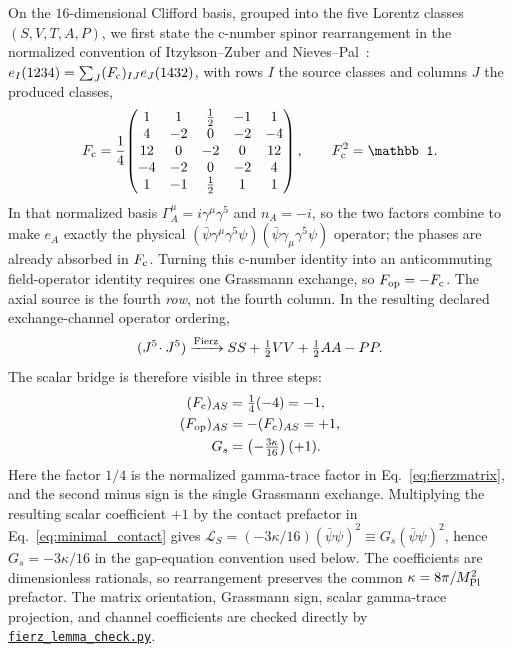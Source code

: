 \documentclass[aps,prd,twocolumn,superscriptaddress,preprintnumbers,nofootinbib,longbibliography,floatfix]{revtex4-2}
\newcommand{\artifactnamed}[2]{\href{https://github.com/Hubify-Projects/bigbounce/blob/7befce143848b925998a3e6ecc850aa510ab3a94/#1}{\nolinkurl{#2}}}
\begin{document}
On the $16$-dimensional Clifford basis, grouped into the five Lorentz classes
$(S,V,T,A,P)$, we first state the c-number spinor rearrangement in the
normalized convention of Itzykson--Zuber and Nieves--Pal~\cite{ItzyksonZuber,NievesPal2004}:
$e_I(1234)=\sum_J(F_{\rm c})_{IJ}e_J(1432)$, with rows $I$ the source classes
and columns $J$ the produced classes,
\begin{equation}\label{eq:fierzmatrix}
F_{\rm c}=\frac14\!\begin{pmatrix}
1&1&\tfrac12&-1&1\\
4&-2&0&-2&-4\\
12&0&-2&0&12\\
-4&-2&0&-2&4\\
1&-1&\tfrac12&1&1
\end{pmatrix},\qquad F_{\rm c}^{2}=\mathbb 1.
\end{equation}
In that normalized basis $\Gamma_A^\mu=i\gamma^\mu\gamma^5$ and
$n_A=-i$, so the two factors combine to make $e_A$ exactly the physical
$(\bar\psi\gamma^\mu\gamma^5\psi)
(\bar\psi\gamma_\mu\gamma^5\psi)$ operator; the phases are already absorbed
in $F_{\rm c}$.  Turning this c-number identity into an anticommuting
field-operator identity requires one Grassmann exchange, so
$F_{\rm op}=-F_{\rm c}$.
The axial source is the fourth
\emph{row}, not the fourth column.  In the resulting declared exchange-channel
operator ordering,
\begin{equation}\label{eq:AAdecomp}
(J^5\!\cdot J^5)\xrightarrow{\rm Fierz}
SS+\tfrac12 VV+\tfrac12 AA-PP.
\end{equation}
The scalar bridge is therefore visible in three steps:
\begin{equation}\label{eq:fierz_scalar_bridge}
\begin{aligned}
(F_{\rm c})_{AS}&=\tfrac14(-4)=-1,\\
(F_{\rm op})_{AS}&=- (F_{\rm c})_{AS}=+1,\\
G_s&=\left(-\tfrac{3\kappa}{16}\right)(+1).
\end{aligned}
\end{equation}
Here the factor $1/4$ is the normalized gamma-trace factor in
Eq.~\eqref{eq:fierzmatrix}, and the second minus sign is the single Grassmann
exchange.  Multiplying the resulting scalar coefficient $+1$ by
the contact prefactor in Eq.~\eqref{eq:minimal_contact} gives
$\mathcal L_{S}=(-3\kappa/16)(\bar\psi\psi)^2
\equiv G_s(\bar\psi\psi)^2$, hence $G_s=-3\kappa/16$ in the gap-equation
convention used below.
The coefficients are dimensionless rationals, so rearrangement preserves the
common $\kappa=8\pi/M_{\rm Pl}^{2}$ prefactor.  The matrix orientation,
Grassmann sign, scalar gamma-trace projection, and channel coefficients are
checked directly by
\artifactnamed{arxiv/scripts/fierz_lemma_check.py}{fierz_lemma_check.py}.
\end{document}
